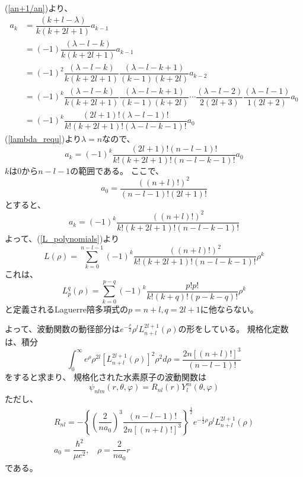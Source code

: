 \documentclass[dvipdfmx,a4paper,16pt]{jsarticle}
\begin{document}
(\ref{an+1/an})より、
\begin{align}
	a_k &= \dfrac{(k+l-\lambda)}{k(k+2l+1)}a_{k-1} \\
			&= (-1)\dfrac{(\lambda-l-k)}{k(k+2l+1)}a_{k-1} \\
			&= (-1)^2\dfrac{(\lambda-l-k)}{k(k+2l+1)}\dfrac{(\lambda-l-k+1)}{(k-1)(k+2l)}a_{k-2} \\
			&= (-1)^k\dfrac{(\lambda-l-k)}{k(k+2l+1)}\dfrac{(\lambda-l-k+1)}{(k-1)(k+2l)}
			\cdots\dfrac{(\lambda-l-2)}{2(2l+3)}\dfrac{(\lambda-l-1)}{1(2l+2)}a_0 \\
			&= (-1)^k\dfrac{(2l+1)!(\lambda-l-1)!}{k!(k+2l+1)!(\lambda-l-k-1)!}a_0
\end{align}
(\ref{lambda_requ})より$\lambda = n$なので、
\begin{equation}
	a_k = (-1)^k\dfrac{(2l+1)!(n-l-1)!}{k!(k+2l+1)!(n-l-k-1)!}a_0
\end{equation}
$k$は$0$から$n-l-1$の範囲である。
ここで、
\begin{equation}
	a_0 = \dfrac{((n+l)!)^2}{(n−l−1)!(2l+1)!}
\end{equation}
とすると、
\begin{equation}
	a_k = (-1)^{k}\dfrac{((n+l)!)^2}{k!(k+2l+1)!(n-l-k-1)!}
\end{equation}
よって、(\ref{L_polynomials})より
\begin{equation}
	L(\rho) = \sum_{k=0}^{n-l-1}(-1)^{k}\dfrac{((n+l)!)^2}{k!(k+2l+1)!(n-l-k-1)!}\rho^k
\end{equation}
これは、
\begin{equation}
	L_p^q(\rho) = \sum_{k = 0}^{p-q} (-1)^{k} \dfrac{p!p!}{k!(k+q)!(p-k-q)!}\rho^k
\end{equation}
と定義されるLaguerre陪多項式の$p = n+l,q = 2l+1$に他ならない。

よって、波動関数の動径部分は$e^{-\frac{\rho}{2}}\rho^l L_{n+l}^{2l+1}(\rho)$の形をしている。
規格化定数は、積分
\begin{equation}
	\int_0^\infty e^\rho \rho^{2l} [L_{n+l}^{2l+1}(\rho)]^2 \rho^2 d\rho
	= \dfrac{2n[(n+l)!]^3}{(n-l-1)!}
\end{equation}
をすると求まり、
規格化された水素原子の波動関数は
\begin{equation}
	\psi_{nlm}(r,\theta,\varphi) = R_{nl}(r)Y_l^m(\theta,\varphi)
\end{equation}
ただし、
\begin{align}
	R_{nl} = - \left\{ \left(\dfrac{2}{na_0}\right)^3\dfrac{(n-l-1)!}{2n[(n+l)!]^3}\right\}^{\frac{1}{2}}e^{-\frac{1}{2}\rho}\rho^l L_{n+l}^{2l+1}(\rho) \\
	a_0 = \dfrac{\hbar^2}{\mu e^2},~~~~\rho = \dfrac{2}{n a_0}r
\end{align}
である。
\end{document}
